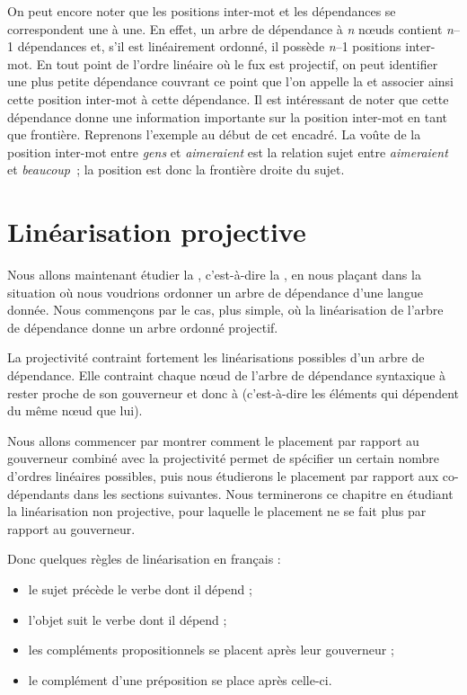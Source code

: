 {    On peut encore noter que les positions inter-mot et les dépendances se correspondent une à une. En effet, un arbre de dépendance à \textit{n} nœuds contient \textit{n}–1 dépendances et, s’il est linéairement ordonné, il possède \textit{n}–1 positions inter-mot. En tout point de l’ordre linéaire où le fux est projectif, on peut identifier une plus petite dépendance couvrant ce point que l’on appelle la  et associer ainsi cette position inter-mot à cette dépendance. Il est intéressant de noter que cette dépendance donne une information importante sur la position inter-mot en tant que frontière. Reprenons l’exemple au début de cet encadré. La voûte de la position inter-mot entre \textit{gens} et \textit{aimeraient} est la relation sujet entre \textit{aimeraient} et \textit{beaucoup~}; la position est donc la frontière droite du sujet.
}
\section{Linéarisation projective}\label{sec:3.5.18}

Nous allons maintenant étudier la , c’est-à-dire la , en nous plaçant dans la situation où nous voudrions ordonner un arbre de dépendance d’une langue donnée. Nous commençons par le cas, plus simple, où la linéarisation de l’arbre de dépendance donne un arbre ordonné projectif.

La projectivité contraint fortement les linéarisations possibles d’un arbre de dépendance. Elle contraint chaque nœud de l’arbre de dépendance syntaxique à rester proche de son gouverneur et donc à  (c’est-à-dire les éléments qui dépendent du même nœud que lui).

Nous allons commencer par montrer comment le placement par rapport au gouverneur combiné avec la projectivité permet de spécifier un certain nombre d’ordres linéaires possibles, puis nous étudierons le placement par rapport aux co-dépendants dans les sections suivantes. Nous terminerons ce chapitre en étudiant la linéarisation non projective, pour laquelle le placement ne se fait plus par rapport au gouverneur.


Donc quelques règles de linéarisation en français :

\begin{itemize}
\item le sujet précède le verbe dont il dépend ;
\item l’objet suit le verbe dont il dépend ;
\item les compléments propositionnels se placent après leur gouverneur ;
\item le complément d’une préposition se place après celle-ci.
\end{itemize}


